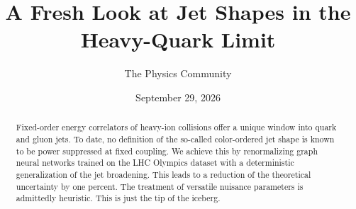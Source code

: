 \documentclass[11pt]{article}
\title{A Fresh Look at Jet Shapes in the Heavy-Quark Limit}
\author{The Physics Community}
\date{September 29, 2026}
\numberwithin{equation}{section}
\theoremstyle{definition}
\theoremstyle{remark}
\begin{document}
\maketitle
\begin{abstract}
Fixed-order energy correlators of heavy-ion collisions offer a unique
window into quark and gluon jets. To date, no definition of the
so-called color-ordered jet shape is known to be power suppressed at
fixed coupling. We achieve this by renormalizing graph neural networks
trained on the LHC Olympics dataset with a deterministic generalization
of the jet broadening. This leads to a reduction of the theoretical
uncertainty by one percent. The treatment of versatile nuisance
parameters is admittedly heuristic. This is just the tip of the iceberg.
\end{abstract}
\tableofcontents




\nocite{*}


\end{document}
